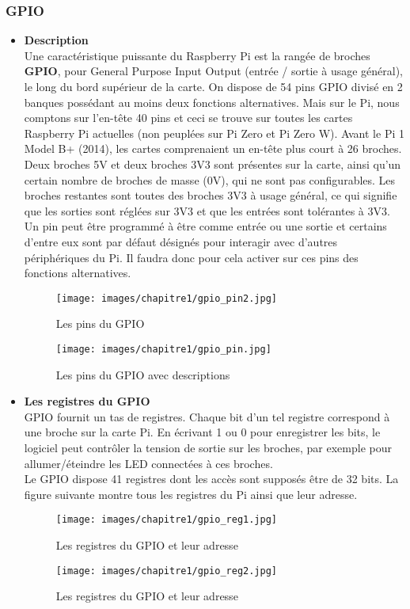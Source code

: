 \documentclass[12pt,a4paper,oneside]{book}
\begin{document}
	\subsubsection{GPIO}
	\begin{itemize}
	\item \textbf{Description}\\
	Une caractéristique puissante du Raspberry Pi est la rangée de broches \textbf{GPIO}, pour General Purpose Input Output (entrée / sortie à usage général), le long du bord supérieur de la carte. On dispose de 54 pins GPIO divisé en 2 banques possédant au moins deux fonctions alternatives. Mais sur le Pi, nous comptons sur l'en-tête 40 pins et ceci se trouve sur toutes les cartes Raspberry Pi actuelles (non peuplées sur Pi Zero et Pi Zero W). Avant le Pi 1 Model B+ (2014), les cartes comprenaient un en-tête plus court à 26 broches. Deux broches 5V et deux broches 3V3 sont présentes sur la carte, ainsi qu’un certain nombre de broches de masse (0V), qui ne sont pas configurables. Les broches restantes sont toutes des broches 3V3 à usage général, ce qui signifie que les sorties sont réglées sur 3V3 et que les entrées sont tolérantes à 3V3. Un pin peut être programmé à être comme entrée ou une sortie et certains d'entre eux sont par défaut désignés pour interagir avec d'autres périphériques du Pi. Il faudra donc pour cela activer sur ces pins des fonctions alternatives. \\
	\begin{figure}[H]
			\centering
			\texttt{[image: images/chapitre1/gpio\_pin2.jpg]}
			\caption{Les pins du GPIO}
			\label{Types}
	\end{figure}
	\begin{figure}[H]
			\centering
			\texttt{[image: images/chapitre1/gpio\_pin.jpg]}
			\caption{Les pins du GPIO avec descriptions}
			\label{Types}
	\end{figure}
	
	\item \textbf{Les registres du GPIO}\\
	GPIO fournit un tas de registres. Chaque bit d'un tel registre correspond à une broche sur la carte Pi. En écrivant 1 ou 0 pour enregistrer les bits, le logiciel peut contrôler la tension de sortie sur les broches, par exemple pour allumer/éteindre les LED connectées à ces broches.\\ 
	Le GPIO dispose 41 registres dont les accès sont supposés être de 32 bits. La figure suivante montre tous les registres du Pi ainsi que leur adresse.\\
		\begin{figure}[H]
				\centering
				\texttt{[image: images/chapitre1/gpio\_reg1.jpg]}
				\caption{Les registres du GPIO et leur adresse}
				\label{Types}
		\end{figure}
		\begin{figure}[H]
		\centering
		\texttt{[image: images/chapitre1/gpio\_reg2.jpg]}
		\caption{Les registres du GPIO et leur adresse}
		\label{Types}
	\end{figure}
		

\end{itemize}
\end{document}

